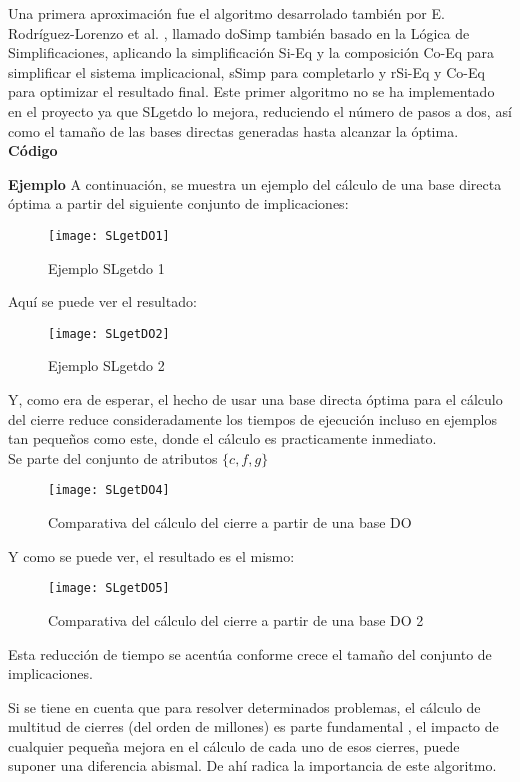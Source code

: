 Una primera aproximaci\'on  fue el algoritmo desarrolado tambi\'en por E. Rodr\'iguez-Lorenzo et al. \cite{doSimp}, llamado doSimp tambi\'en basado en la L\'ogica de Simplificaciones, aplicando la simplificaci\'on Si-Eq y la composici\'on Co-Eq para simplificar el sistema implicacional, sSimp para completarlo y rSi-Eq y Co-Eq para optimizar el resultado final. Este primer algoritmo no se ha implementado en el proyecto ya que SLgetdo lo mejora, reduciendo el n\'umero de pasos a dos, as\'i como el tama\~no de las bases directas generadas hasta alcanzar la \'optima.
\newpage
\textbf{C\'odigo} 

\newpage

\newpage
\textbf{Ejemplo} 
A continuaci\'on, se muestra un ejemplo del c\'alculo de una base directa \'optima a partir del siguiente conjunto de implicaciones: 
\begin{figure}[H]
    \centering
    \texttt{[image: SLgetDO1]}
    \caption{Ejemplo SLgetdo 1}
    \label{fig:SLgetDO1}
\end{figure} 

Aqu\'i se puede ver el resultado:
\begin{figure}[H]
    \centering
    \texttt{[image: SLgetDO2]}
    \caption{Ejemplo SLgetdo 2}
    \label{fig:SLgetDO2}
\end{figure} 
Y, como era de esperar, el hecho de usar una base directa \'optima para el c\'alculo del cierre reduce consideradamente los tiempos de ejecuci\'on incluso en ejemplos tan peque\~nos como este, donde el c\'alculo es practicamente inmediato.\\

Se parte del conjunto de atributos \(\{c,f,g\}\)

\begin{figure}[H]
    \centering
    \texttt{[image: SLgetDO4]}
    \caption{Comparativa del c\'alculo del cierre a partir de una base DO}
    \label{fig:SLgetDO4}
\end{figure}

Y como se puede ver, el resultado es el mismo:
\begin{figure}[H]
    \centering
    \texttt{[image: SLgetDO5]}
    \caption{Comparativa del c\'alculo del cierre a partir de una base DO 2}
    \label{fig:SLgetDO5}
\end{figure}

Esta reducci\'on de tiempo se acent\'ua conforme crece el tama\~no del conjunto de implicaciones.

Si se tiene en cuenta que para resolver determinados problemas, el c\'alculo de multitud de cierres (del orden de millones) es parte fundamental \cite{Adaricheva}, el impacto de cualquier peque\~na mejora en el c\'alculo de cada uno de esos cierres, puede suponer una diferencia abismal. De ah\'i radica la importancia de este algoritmo.

